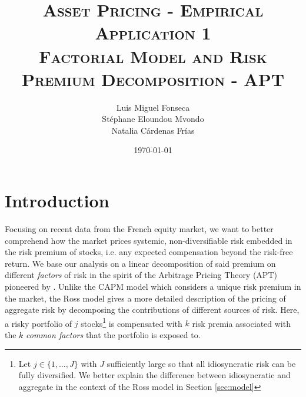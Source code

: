 \documentclass[hidelinks,11pts]{article}
\DeclareMathOperator{\1}{\mathbbm{1}}
\begin{document}
        \title{\scshape{Asset Pricing - Empirical Application 1\\Factorial Model and Risk Premium Decomposition - APT }}%
        \author{Luis Miguel Fonseca \\ Stéphane Eloundou Mvondo\\ Natalia Cárdenas Frías }
        \date{\today}
        \maketitle 




\section*{Introduction}

Focusing on recent data from the French equity market, we want to better comprehend how the market prices systemic, non-diversifiable risk embedded in the risk premium of stocks, i.e. any expected compensation beyond the risk-free return.
We base our analysis on a linear decomposition of said premium on different \emph{factors} of risk in the spirit of the Arbitrage Pricing Theory (APT) pioneered by \cite{rossArbitrageTheoryCapital1976}. 
Unlike the CAPM model which considers a unique risk premium in the market, the Ross model gives a more detailed description of the pricing of aggregate risk by decomposing the contributions of different sources of risk. 
Here, a risky portfolio of $j$ stocks\footnote{Let $j \in \{1,...,J\}$ with $J$ sufficiently large so that all idiosyncratic risk can be fully diversified. We better explain the difference between idiosyncratic and aggregate in the context of the Ross model in Section \ref{sec:model}} is compensated with  $k$ risk premia associated with the $k$ \emph{common factors} that the portfolio is exposed to.
\end{document}
